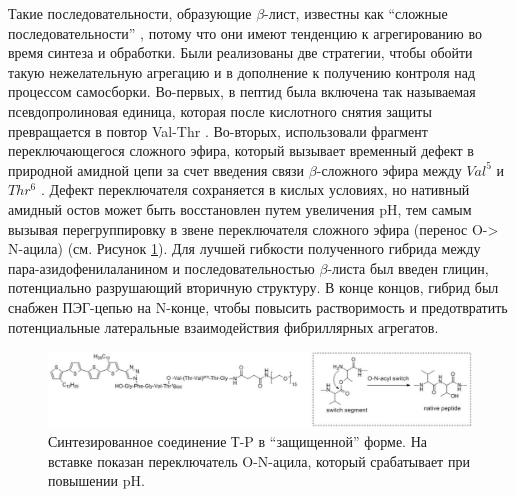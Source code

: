     Такие последовательности, образующие $\beta$-лист, известны как ``сложные последовательности'' \cite{eckhardt_rational_2005,hentschel_peptide-guided_2007}, потому что они имеют тенденцию к агрегированию во время синтеза и обработки. Были реализованы две стратегии, чтобы обойти такую нежелательную агрегацию и в дополнение к получению контроля над процессом самосборки. Во-первых, в пептид была включена так называемая псевдопролиновая единица, которая после кислотного снятия защиты превращается в повтор Val-Thr \cite{wohr_pseudo-prolines_1996}. Во-вторых, использовали фрагмент переключающегося сложного эфира, который вызывает временный дефект в природной амидной цепи за счет введения связи $\beta$-сложного эфира между $Val^5$ и $Thr^6$ \cite{sohma_novel_2004,mutter_switch_2004,carpino_synthesis_2004}. Дефект переключателя сохраняется в кислых условиях, но нативный амидный остов может быть восстановлен путем увеличения pH, тем самым вызывая перегруппировку в звене переключателя сложного эфира (перенос O-> N-ацила) (см. Рисунок \ref{fig:p4_p1_f8}). Для лучшей гибкости полученного гибрида между пара-азидофенилаланином и последовательностью $\beta$-листа был введен глицин, потенциально разрушающий вторичную структуру. В конце концов, гибрид был снабжен ПЭГ-цепью на N-конце, чтобы повысить растворимость и предотвратить потенциальные латеральные взаимодействия фибриллярных агрегатов.

\begin{figure} [H]
    \centering
    \includegraphics[width=\textwidth]{images/p4/punkt1/part4_p1_f8.pdf}
    \caption[Синтезированное соединение Т-P в ``защищенной'' форме]{Синтезированное соединение Т-P в ``защищенной'' форме. На вставке показан переключатель O-N-ацила, который срабатывает при повышении pH.}
    \label{fig:p4_p1_f8}
\end{figure}

